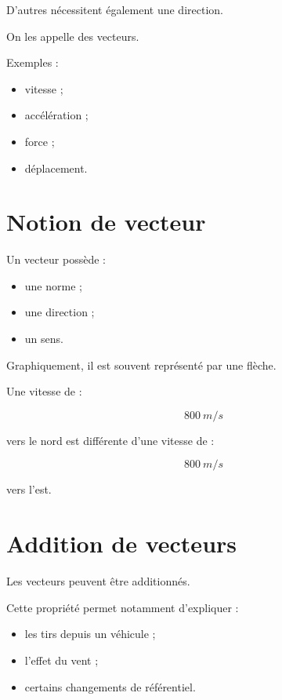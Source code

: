 D'autres nécessitent également une direction.

On les appelle des vecteurs.

Exemples :

\begin{itemize}
    \item vitesse ;
    \item accélération ;
    \item force ;
    \item déplacement.
\end{itemize}

\section{Notion de vecteur}

Un vecteur possède :

\begin{itemize}
    \item une norme ;
    \item une direction ;
    \item un sens.
\end{itemize}

Graphiquement, il est souvent représenté par une flèche.

\begin{exemple}

Une vitesse de :

\begin{equation}
800~m/s
\end{equation}

vers le nord est différente d'une vitesse de :

\begin{equation}
800~m/s
\end{equation}

vers l'est.

\end{exemple}

\section{Addition de vecteurs}

Les vecteurs peuvent être additionnés.

Cette propriété permet notamment d'expliquer :

\begin{itemize}
    \item les tirs depuis un véhicule ;
    \item l'effet du vent ;
    \item certains changements de référentiel.
\end{itemize}

